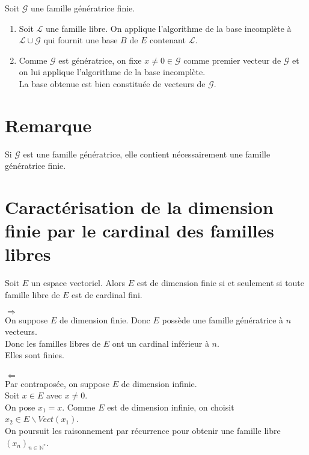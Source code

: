 \documentclass[../main.tex]{subfiles}
\begin{document}
\noindent Soit $\mathcal{G}$ une famille génératrice finie. 
\begin{enumerate}
    \item Soit $\mathcal{L}$ une famille libre. On applique l'algorithme de la base incomplète à $\mathcal{L} \cup \mathcal{G}$ qui fournit une base $B$ de $E$ contenant $\mathcal{L}$. 
    \item Comme $\mathcal{G}$ est génératrice, on fixe $x \neq 0 \in \mathcal{G}$ comme premier vecteur de $\mathcal{G}$ et on lui applique l'algorithme de la base incomplète. \\
    La base obtenue est bien constituée de vecteurs de $\mathcal{G}$. 
\end{enumerate}

\section*{Remarque}
\begin{tcolorbox}[title=Remarque, title filled=false, colframe=lightblue, colback=lightblue!10!white]
    Si $\mathcal{G}$ est une famille génératrice, elle contient nécessairement une famille génératrice finie. 
\end{tcolorbox}

\section{Caractérisation de la dimension finie par le cardinal des familles libres}
\begin{tcolorbox}[title=Corollaire 22.11, title filled=false, colframe=orange, colback=orange!10!white]
    Soit $E$ un espace vectoriel. Alors $E$ est de dimension finie si et seulement si toute famille libre de $E$ est de cardinal fini. 
\end{tcolorbox}

$\boxed{\Rightarrow}$ \\
On suppose $E$ de dimension finie. Donc $E$ possède une famille génératrice à $n$ vecteurs. \\
Donc les familles libres de $E$ ont un cardinal inférieur à $n$. \\
Elles sont finies. \\ \\

$\boxed{\Leftarrow}$ \\
Par contraposée, on suppose $E$ de dimension infinie. \\
Soit $x\in E$ avec $x\neq 0$. \\
On pose $x_1 = x$. Comme $E$ est de dimension infinie, on choisit $x_2 \in E \backslash Vect(x_1)$. \\
On poursuit les raisonnement par récurrence pour obtenir une famille libre $(x_n)_{n\in \mathbb{N}^*}$. 
\end{document}

